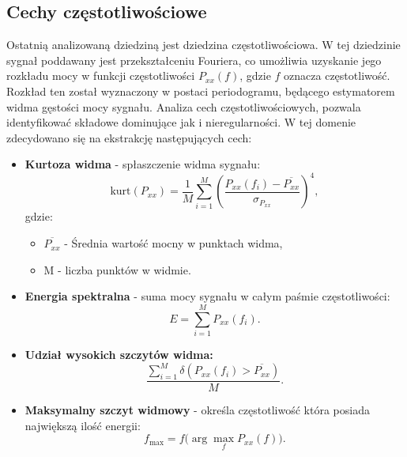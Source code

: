 \documentclass[a4paper,twoside,12pt]{book}
\begin{document}
\subsection*{Cechy częstotliwościowe}
Ostatnią analizowaną dziedziną jest dziedzina częstotliwościowa. W tej dziedzinie sygnał poddawany jest przekształceniu Fouriera, co umożliwia uzyskanie jego rozkładu mocy w funkcji częstotliwości $P_{xx}(f)$, gdzie $f$ oznacza częstotliwość. Rozkład ten został wyznaczony w postaci periodogramu, będącego estymatorem widma gęstości mocy sygnału.  Analiza cech częstotliwościowych, pozwala identyfikować składowe dominujące jak i nieregularności. W tej domenie zdecydowano się na ekstrakcję następujących cech:
\begin{itemize}
	\setcounter{enumi}{9}


	\item \textbf{Kurtoza widma} - spłaszczenie widma sygnału:
	      \begin{equation}
		      \text{kurt}(P_{xx}) = \frac{1}{M} \sum_{i=1}^M \left( \frac{P_{xx}(f_i) - \overline{P_{xx}}}{\sigma_{P_{xx}}} \right)^4,
	      \end{equation}
	      \noindent gdzie:
	      \begin{itemize}
		      \item \( \overline{P_{xx}} \) - Średnia wartość mocny w punktach widma,
		      \item M - liczba punktów w widmie.
	      \end{itemize}

	\item \textbf{Energia spektralna} - suma mocy sygnału w całym paśmie częstotliwości:
	      \begin{equation}
		      E = \sum_{i=1}^{M} P_{xx}(f_i).
	      \end{equation}

	\item \textbf{Udział wysokich szczytów widma:}
	      \begin{equation}
		      \frac{\sum_{i=1}^{M} \delta(P_{xx}(f_i) > \overline{P_{xx}} )}{M}.
	      \end{equation}
	\item \textbf{Maksymalny szczyt widmowy} - określa częstotliwość która posiada największą ilość energii:
	      \begin{equation}
		      f_{\max} = f \bigl( \arg\max_{f} P_{xx}(f) \bigr).
	      \end{equation}
\end{itemize}
\end{document}
